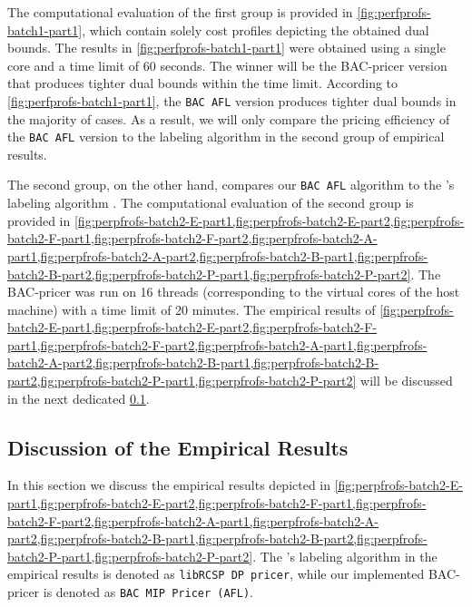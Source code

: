 The computational evaluation of the first group is provided in \cref{fig:perfprofs-batch1-part1},
which contain solely cost profiles depicting the obtained dual bounds.
The results in \cref{fig:perfprofs-batch1-part1} were obtained using a single core and a time limit of 60 seconds.
The winner will be the BAC-pricer version that produces tighter dual bounds within the time limit.
According to \cref{fig:perfprofs-batch1-part1}, the \texttt{BAC AFL} version produces tighter dual bounds in the majority of cases.
As a result, we will only compare the pricing efficiency of the \texttt{BAC AFL} version to the labeling algorithm in the second group of empirical results.

\medskip

The second group, on the other hand, compares our \texttt{BAC AFL} algorithm to the \vrpsolver{}'s labeling algorithm \parencite{pessoa2020generic}.
The computational evaluation of the second group is provided in
\cref{fig:perpfrofs-batch2-E-part1,fig:perpfrofs-batch2-E-part2,fig:perpfrofs-batch2-F-part1,fig:perpfrofs-batch2-F-part2,fig:perpfrofs-batch2-A-part1,fig:perpfrofs-batch2-A-part2,fig:perpfrofs-batch2-B-part1,fig:perpfrofs-batch2-B-part2,fig:perpfrofs-batch2-P-part1,fig:perpfrofs-batch2-P-part2}.
The BAC-pricer was run on 16 threads (corresponding to the virtual cores of the host machine) with a time limit of 20 minutes.
The empirical results of
\cref{fig:perpfrofs-batch2-E-part1,fig:perpfrofs-batch2-E-part2,fig:perpfrofs-batch2-F-part1,fig:perpfrofs-batch2-F-part2,fig:perpfrofs-batch2-A-part1,fig:perpfrofs-batch2-A-part2,fig:perpfrofs-batch2-B-part1,fig:perpfrofs-batch2-B-part2,fig:perpfrofs-batch2-P-part1,fig:perpfrofs-batch2-P-part2}
will be discussed in the next dedicated \cref{sec:results-discussion}.




\subsection{Discussion of the Empirical Results}
\label{sec:results-discussion}

In this section we discuss the empirical results depicted in
\cref{fig:perpfrofs-batch2-E-part1,fig:perpfrofs-batch2-E-part2,fig:perpfrofs-batch2-F-part1,fig:perpfrofs-batch2-F-part2,fig:perpfrofs-batch2-A-part1,fig:perpfrofs-batch2-A-part2,fig:perpfrofs-batch2-B-part1,fig:perpfrofs-batch2-B-part2,fig:perpfrofs-batch2-P-part1,fig:perpfrofs-batch2-P-part2}.
The \vrpsolver{}'s labeling algorithm in the empirical results is denoted as \texttt{libRCSP DP pricer},
while our implemented BAC-pricer is denoted as \texttt{BAC MIP Pricer (AFL)}.

